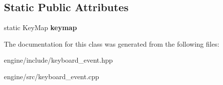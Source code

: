 \subsection*{Static Public Attributes}
\begin{DoxyCompactItemize}
\item 
static Key\+Map {\bfseries keymap}\hypertarget{classengine_1_1_keyboard_event_a6e1cc1c7a3de88bd17d143001ef6bc7b}{}\label{classengine_1_1_keyboard_event_a6e1cc1c7a3de88bd17d143001ef6bc7b}

\end{DoxyCompactItemize}


The documentation for this class was generated from the following files\+:\begin{DoxyCompactItemize}
\item 
engine/include/keyboard\+\_\+event.\+hpp\item 
engine/src/keyboard\+\_\+event.\+cpp\end{DoxyCompactItemize}
